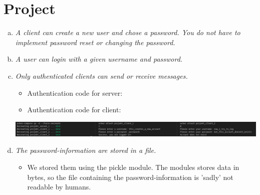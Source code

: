 \section{Project}


 \begin{enumerate}[(a)]
    \item {\itshape A client can create a new user and chose a password. You do not have to implement password reset or changing the password.}
    
    \item {\itshape A user can login with a given username and password.}


    \item {\itshape Only authenticated clients can send or receive messages.}
    \begin{itemize}
        \item Authentication code for server:
        
        \newpage
        \item Authentication code for client:
        
    \end{itemize}
    \newline \includegraphics[width=1\linewidth]{src/u4/output.png}

    \item {\itshape The password-information are stored in a file.}
    \begin{itemize}
        \item We stored them using the pickle module. The modules stores data in bytes, so the file containing the password-information is 'sadly' not readable by humans. 
    \end{itemize}
    
\end{enumerate}

